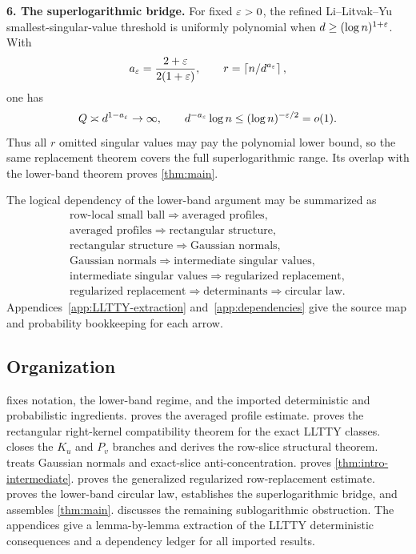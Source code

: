 \smallskip
\noindent\textbf{6. The superlogarithmic bridge.}
For fixed $\varepsilon>0$, the refined Li--Litvak--Yu smallest-singular-value threshold is uniformly polynomial when $d\ge(\log n)^{1+\varepsilon}$. With
\[
  a_\varepsilon=\frac{2+\varepsilon}{2(1+\varepsilon)},
  \qquad
  r=\left\lceil n/d^{a_\varepsilon}\right\rceil,
\]
one has
\[
  Q\asymp d^{1-a_\varepsilon}\to\infty,
  \qquad
  d^{-a_\varepsilon}\log n\le(\log n)^{-\varepsilon/2}=o(1).
\]
Thus all $r$ omitted singular values may pay the polynomial lower bound, so the same replacement theorem covers the full superlogarithmic range. Its overlap with the lower-band theorem proves \cref{thm:main}.

The logical dependency of the lower-band argument may be summarized as
\[
\begin{gathered}
\text{row-local small ball}\Longrightarrow\text{averaged profiles},\\
\text{averaged profiles}\Longrightarrow\text{rectangular structure},\\
\text{rectangular structure}\Longrightarrow\text{Gaussian normals},\\
\text{Gaussian normals}\Longrightarrow\text{intermediate singular values},\\
\text{intermediate singular values}\Longrightarrow\text{regularized replacement},\\
\text{regularized replacement}\Longrightarrow\text{determinants}
\Longrightarrow\text{circular law}.
\end{gathered}
\]
Appendices~\ref{app:LLTTY-extraction} and~\ref{app:dependencies} give the source map and probability bookkeeping for each arrow.

\subsection{Organization}

 fixes notation, the lower-band regime, and the imported deterministic and probabilistic ingredients.  proves the averaged profile estimate.  proves the rectangular right-kernel compatibility theorem for the exact LLTTY classes.  closes the $K_u$ and $P_v$ branches and derives the row-slice structural theorem.  treats Gaussian normals and exact-slice anti-concentration.  proves \cref{thm:intro-intermediate}.  proves the generalized regularized row-replacement estimate.  proves the lower-band circular law, establishes the superlogarithmic bridge, and assembles \cref{thm:main}.  discusses the remaining sublogarithmic obstruction. The appendices give a lemma-by-lemma extraction of the LLTTY deterministic consequences and a dependency ledger for all imported results.
